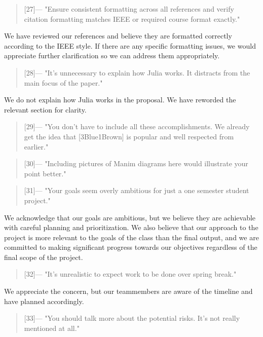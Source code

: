 \begin{quotation} [27]---%
  "Ensure consistent formatting across all references and verify citation formatting matches IEEE or required course format exactly."
\end{quotation}
\noindent We have reviewed our references and believe they are formatted correctly according to the IEEE style. If there are any specific formatting issues, we would appreciate further clarification so we can address them appropriately.

\noindent\hrulefill

\begin{quotation} [28]---%
  "It's unnecessary to explain how Julia works. It distracts from the main focus of the paper."
\end{quotation}
\noindent We do not explain how Julia works in the proposal. We have reworded the relevant section for clarity.

\begin{quotation} [29]---%
  "You don't have to include all these accomplishments. We already get the idea that [3Blue1Brown] is popular and well respected from earlier."
\end{quotation}

\begin{quotation} [30]---%
  "Including pictures of Manim diagrams here would illustrate your point better."
\end{quotation}

\begin{quotation} [31]---%
  "Your goals seem overly ambitious for just a one semester student project."
\end{quotation}
\noindent We acknowledge that our goals are ambitious, but we believe they are achievable with careful planning and prioritization. We also believe that our approach to the project is more relevant to the goals of the class than the final output, and we are committed to making significant progress towards our objectives regardless of the final scope of the project.

\begin{quotation} [32]---%
  "It's unrealistic to expect work to be done over spring break."
\end{quotation}
\noindent We appreciate the concern, but our teammembers are aware of the timeline and have planned accordingly.

\begin{quotation} [33]---%
  "You should talk more about the potential risks. It's not really mentioned at all."
\end{quotation}

